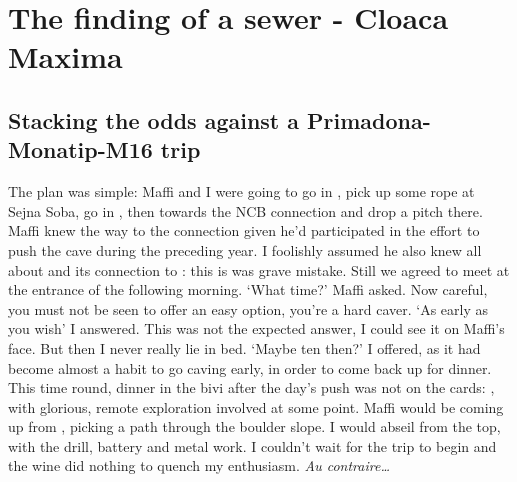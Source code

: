 \section{The finding of a sewer - Cloaca Maxima}

\begin{marginfigure}
\end{marginfigure}

\subsection{Stacking the odds against a Primadona-Monatip-M16 trip}
The plan was simple: Maffi and I were going to go in , pick up some rope at Sejna Soba, go in , then towards the NCB connection and drop a pitch there. Maffi knew the way to the connection given he'd participated in the effort to push the cave during the preceding year. I foolishly assumed he also knew all about  and its connection to : this is was grave mistake. Still we agreed to meet at the entrance of  the following morning. 
`What time?' Maffi asked. Now careful, you must not be seen to offer an easy option, you're a hard caver.
`As early as you wish' I answered. This was not the expected answer, I could see it on Maffi's face. But then I never really lie in bed.
`Maybe ten then?' I offered, as it had become almost a habit to go caving early, in order to come back up for dinner. This time round, dinner in the bivi after the day's push was not on the cards: , with glorious, remote exploration involved at some point. Maffi would be coming up from , picking a path through the boulder slope. I would abseil from the top, with the drill, battery and metal work. I couldn't wait for the trip to begin and the wine did nothing to quench my enthusiasm. \textit{Au contraire…}

